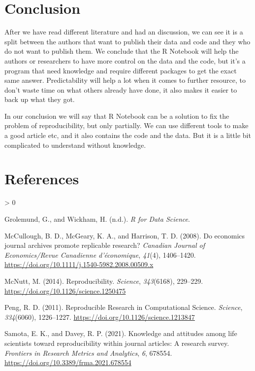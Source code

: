 \documentclass[
  12pt,
]{article}
\newlength{\cslhangindent}
\newenvironment{CSLReferences}[2] %
 {%
  \setlength{\parindent}{0pt}
  \ifodd #1 \everypar{\setlength{\hangindent}{\cslhangindent}}\ignorespaces\fi
  \ifnum #2 > 0
  \setlength{\parskip}{#2\baselineskip}
  \fi
 }%
 {}
\begin{document}
\hypertarget{conclusion}{%
\section{Conclusion}\label{conclusion}}

After we have read different literature and had an discussion, we can
see it is a split between the authors that want to publish their data
and code and they who do not want to publish them. We conclude that the
R Notebook will help the authors or researchers to have more control on
the data and the code, but it's a program that need knowledge and
require different packages to get the exact same answer. Predictability
will help a lot when it comes to further resource, to don't waste time
on what others already have done, it also makes it easier to back up
what they got.

In our conclusion we will say that R Notebook can be a solution to fix
the problem of reproducibility, but only partially. We can use different
tools to make a good article etc, and it also contains the code and the
data. But it is a little bit complicated to understand without
knowledge.

\hypertarget{references}{%
\section{References}\label{references}}

\hypertarget{refs}{}
\begin{CSLReferences}{1}{0}
\leavevmode\hypertarget{ref-grolemund}{}%
Grolemund, G., and Wickham, H. (n.d.). \emph{R for {Data Science}}.

\leavevmode\hypertarget{ref-mccullough2008}{}%
McCullough, B. D., McGeary, K. A., and Harrison, T. D. (2008). Do
economics journal archives promote replicable research? \emph{Canadian
Journal of Economics/Revue Canadienne d'économique}, \emph{41}(4),
1406--1420. \url{https://doi.org/10.1111/j.1540-5982.2008.00509.x}

\leavevmode\hypertarget{ref-mcnutt2014}{}%
McNutt, M. (2014). Reproducibility. \emph{Science}, \emph{343}(6168),
229--229. \url{https://doi.org/10.1126/science.1250475}

\leavevmode\hypertarget{ref-peng2011}{}%
Peng, R. D. (2011). Reproducible {Research} in {Computational Science}.
\emph{Science}, \emph{334}(6060), 1226--1227.
\url{https://doi.org/10.1126/science.1213847}

\leavevmode\hypertarget{ref-samota2021}{}%
Samota, E. K., and Davey, R. P. (2021). Knowledge and attitudes among
life scientists toward reproducibility within journal articles: A
research survey. \emph{Frontiers in Research Metrics and Analytics},
\emph{6}, 678554. \url{https://doi.org/10.3389/frma.2021.678554}

\end{CSLReferences}
\end{document}
